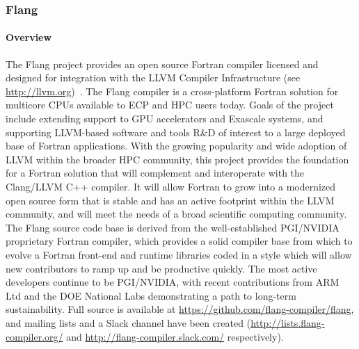 \subsubsection{Flang}\label{subsubsect:flang}

\paragraph{Overview}
The Flang project provides an open source Fortran
\cite{iso-fortran-2004} \cite{iso-fortran-2010} \cite{iso-fortran-2018}
compiler licensed and designed
for integration with the LLVM Compiler Infrastructure (see \url{http://llvm.org})~\cite{llvm:homepage}.
The Flang compiler is a cross-platform Fortran solution for multicore CPUs available
to ECP and HPC users today. Goals of the project include extending support to GPU
accelerators and Exascale systems, and supporting LLVM-based software and tools
R\&D of interest to a large deployed base of Fortran applications.  With the growing
popularity and wide adoption of LLVM within the broader HPC community, this project
provides the foundation for a Fortran solution that will complement and interoperate
with the Clang/LLVM C++ compiler.  It will allow Fortran to grow into a modernized
open source form that is stable and has an active footprint within the LLVM
community, and will meet the needs of a broad scientific computing community.  The
Flang source code base is derived from the well-established PGI/NVIDIA proprietary
Fortran compiler, which provides a solid compiler base from which to evolve a
Fortran front-end and runtime libraries coded in a style which will allow new
contributors to ramp up and be productive quickly.  The most active developers
continue to be PGI/NVIDIA, with recent contributions from ARM Ltd and the DOE
National Labs demonstrating a path to long-term sustainability.  Full source is
available at \url{https://github.com/flang-compiler/flang}, and mailing lists and a
Slack channel have been created (\url{http://lists.flang-compiler.org/} and
\url{http://flang-compiler.slack.com/} respectively).

